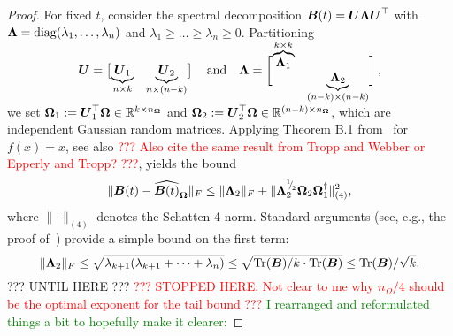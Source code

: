 \begin{proof}
For fixed $t$, consider the spectral decomposition $\boldsymbol{B}(t) = \boldsymbol{U} \boldsymbol{\Lambda} \boldsymbol{U}^{\top}$ with  
$\boldsymbol{\Lambda} = \operatorname{diag}(\lambda_1, \dots, \lambda_n)$ and $\lambda_1 \ge \dots \ge \lambda_n \ge 0$. Partitioning
    \begin{equation*}
        \rule[\dimexpr-2ex-\ht\strutbox]{0pt}{\dimexpr2ex+4ex+\baselineskip}
        \mtx{U} = \begin{bmatrix}
            \smash{\underbrace{\mtx{U}_1}_{n \times k}} & \smash{\underbrace{\mtx{U}_2}_{n \times (n-k)}}
        \end{bmatrix}
        \quad \text{and} \quad
        \mtx{\Lambda} =
        \begin{bmatrix}
            \smash{\overbrace{\mtx{\Lambda}_1}^{k \times k}} & \\ & \smash{\underbrace{\mtx{\Lambda}_2}_{(n-k) \times (n-k)}}
        \end{bmatrix},
    \end{equation*}
    we set
    $\boldsymbol{\Omega}_1 := \boldsymbol{U}_1^{\top} \boldsymbol{\Omega} \in \mathbb{R}^{k \times n_{\boldsymbol{\Omega}}}$ and $\boldsymbol{\Omega}_2 := \boldsymbol{U}_2^{\top} \boldsymbol{\Omega} \in \mathbb{R}^{(n - k) \times n_{\boldsymbol{\Omega}}}$, which are independent Gaussian random matrices.
Applying Theorem B.1 from~\cite{persson-2023-randomized-lowrank} for $f(x) = x$, see also \textcolor{red}{??? Also cite the same result from Tropp and Webber or Epperly and Tropp? ???}, yields the bound
    \begin{equation}
        \lVert \boldsymbol{B}(t) - \widehat{\boldsymbol{B}(t)}_{\boldsymbol{\Omega}} \rVert _F 
        \leq  \lVert \boldsymbol{\Lambda}_2 \rVert _F + \lVert \boldsymbol{\Lambda}_2^{{}^{1}{\mskip -5mu/\mskip -3mu}_{2}} \boldsymbol{\Omega}_2 \boldsymbol{\Omega}_1^{\dagger} \rVert _{(4)}^2,
        \label{equ:nystrom-proof-persson-bonud}
    \end{equation}
    where $\lVert \cdot \rVert _{(4)}$ denotes the Schatten-4 norm. Standard arguments (see, e.g., the proof of~\cite[Lemma 3]{meyer-2021-hutch-optimal}) provide a simple bound on the first term:
    \begin{equation}
        \lVert \boldsymbol{\Lambda}_2 \rVert _F
        \leq \sqrt{ \lambda_{k+1} (  \lambda_{k+1} + \cdots + \lambda_{n})}
        \leq \sqrt{ \operatorname{Tr}(\boldsymbol{B}) / k \cdot \operatorname{Tr}(\boldsymbol{B})}
        \leq \operatorname{Tr}(\boldsymbol{B}) / \sqrt{k}.
        \label{equ:nystrom-proof-frobenius-trace}
    \end{equation}
    ??? UNTIL HERE ???
    \textcolor{red}{??? STOPPED HERE: Not clear to me why $n_\Omega/4$ should be the optimal exponent for the tail bound ???} \textcolor{green}{I rearranged and reformulated things a bit to hopefully make it clearer:}
    

\end{proof}
